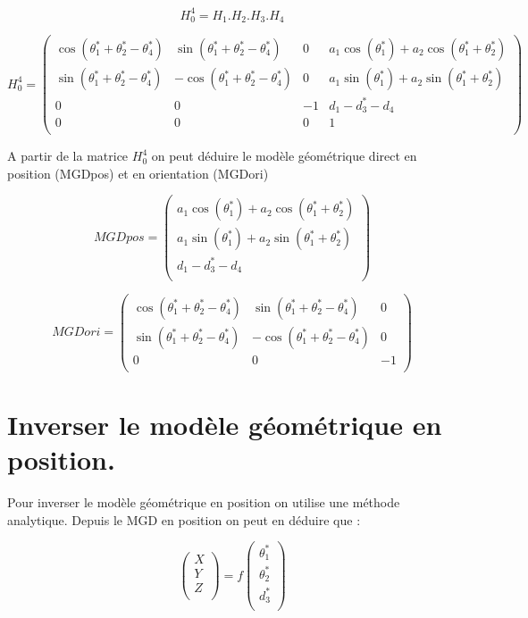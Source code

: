 \documentclass[]{article}
\begin{document}
\[
  H_0^4 = H_1.H_2.H_3.H_4 
\]

\[ 
  H_0^4 =
  \begin{pmatrix}
    \cos (\theta^*_1+\theta^*_2-\theta^*_4) & \sin (\theta^*_1+\theta^*_2-\theta^*_4) & 0 & a_1 \cos (\theta^*_1)+a_2 \cos (\theta^*_1+\theta^*_2) \\
    \sin (\theta^*_1+\theta^*_2-\theta^*_4) & -\cos (\theta^*_1+\theta^*_2-\theta^*_4) & 0 & a_1 \sin (\theta^*_1)+a_2 \sin (\theta^*_1+\theta^*_2) \\
    0 & 0 & -1 & d_1-d^*_3-d_4 \\
    0 & 0 & 0 & 1 \\
  \end{pmatrix}
\]

A partir de la matrice $H_0^4$ on peut
déduire le modèle géométrique direct en position (MGDpos) et en
orientation (MGDori)

\[ 
  MGDpos =
  \begin{pmatrix}
    a_1 \cos (\theta^*_1)+a_2 \cos(\theta^*_1+\theta^*_2) \\
    a_1 \sin (\theta^*_1)+a_2 \sin(\theta^*_1+\theta^*_2) \\
    d_1-d^*_3-d_4 \\
  \end{pmatrix}
\]

\[ 
  MGDori =
  \begin{pmatrix}
    \cos (\theta^*_1+\theta^*_2-\theta^*_4) & \sin (\theta^*_1+\theta^*_2-\theta^*_4) & 0 \\
    \sin (\theta^*_1+\theta^*_2-\theta^*_4) & -\cos (\theta^*_1+\theta^*_2-\theta^*_4) & 0 \\
    0 & 0 & -1\\
  \end{pmatrix}
\]

\section{Inverser le modèle géométrique en position.}

Pour inverser le modèle géométrique en position on utilise une méthode
analytique. Depuis le MGD en position on peut en déduire que :

\[
  \begin{pmatrix}
    X\\
    Y\\
    Z\\
  \end{pmatrix}
  = f
  \begin{pmatrix}
    \theta^*_1 \\
    \theta^*_2 \\
    d^*_3 \\
  \end{pmatrix}
\]
\end{document}
